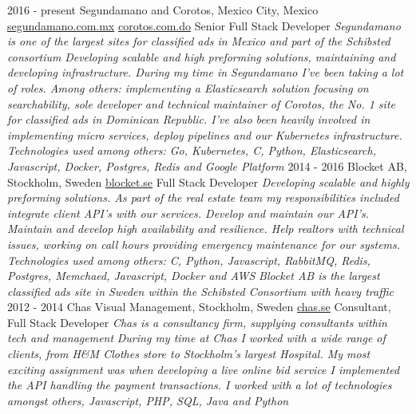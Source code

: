 \documentclass[]{friggeri-cv}
\begin{document}
\begin{entrylist}
  \bigentry
    {2016 - present}
    {Segundamano and Corotos, Mexico City, Mexico \newline
        {\href{https://www.segundamano.com.mx/}{segundamano.com.mx}} \newline
        {\href{https://www.corotos.com.do/}{corotos.com.do}}
    }
    {Senior Full Stack Developer}
    {\textit{Segundamano is one of the largest sites for classified ads in Mexico and part of the Schibsted consortium}}
    {\emph{Developing scalable and high preforming solutions, maintaining and developing infrastructure. During my time in Segundamano I've been taking a lot of roles. Among others: implementing a Elasticsearch solution focusing on searchability, sole developer and technical maintainer of Corotos, the No. 1 site for classified ads in Dominican Republic. I've also been heavily involved in implementing micro services, deploy pipelines and our Kubernetes infrastructure. Technologies used among others: Go, Kubernetes, C, Python, Elasticsearch, Javascript, Docker, Postgres, Redis and Google Platform}}
  \bigentry
    {2014 - 2016}
    {Blocket AB, Stockholm, Sweden \newline
        {\href{http://blocket.se}{blocket.se}}
    }
    {Full Stack Developer}
    {\textit{Developing scalable and highly preforming solutions. As part of the real estate team my
    responsibilities included integrate client API's with our services. Develop and maintain our
    API's. Maintain and develop high availability and resilience. Help realtors with technical issues, working on call hours providing emergency maintenance for our systems. Technologies used among others: C, Python, Javascript, RabbitMQ, Redis, Postgres, Memchaed, Javascript, Docker and AWS}}
    {\emph{Blocket AB is the largest classified ads site in Sweden within the Schibsted Consortium with heavy traffic}
    }
  \bigentry
    {2012 - 2014}
    {Chas Visual Management, Stockholm, Sweden \newline
        {\href{https://chas.se/}{chas.se}}
    }
    {Consultant, Full Stack Developer}
    {\textit{Chas is a consultancy firm, supplying consultants within tech and management}}
    {\emph{During my time at Chas I worked with a wide range of clients, from H\&M Clothes store to Stockholm's largest Hospital. My most exciting assignment was when developing a live online bid service I implemented the API handling the payment transactions. I worked with a lot of technologies amongst others, Javascript, PHP, SQL, Java and Python}}
\end{entrylist}
\end{document}
